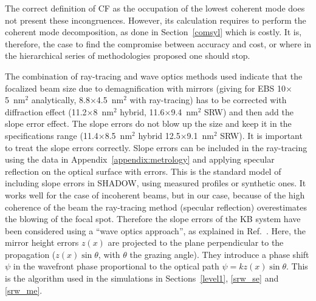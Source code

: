 \documentclass{iucr}              %
\newcommand{\inred}[1]{{\color{black}#1}}
\begin{document}
The correct definition of CF as the occupation of the lowest coherent mode does not present these incongruences. However, its calculation requires to perform the coherent mode decomposition, as done in Section~\ref{comsyl} which is costly. It is, therefore, the case to find the compromise between accuracy and cost, or where in the hierarchical series of methodologies proposed one should stop. 

The combination of ray-tracing and wave optics methods used indicate that the focalized beam size due to  demagnification with mirrors (giving for EBS 10$\times$5~nm$^2$ analytically, 8.8$\times$4.5~nm$^2$ with ray-tracing) has to be corrected with diffraction effect (11.2$\times$8~nm$^2$ hybrid, 11.6$\times$9.4~nm$^2$ SRW) and then add the slope error effect. The slope errors do not blow up the size and \inred{keep} it in the specifications range (11.4$\times$8.5~nm$^2$ hybrid 12.5$\times$9.1~nm$^2$ SRW). It is important to treat the slope errors correctly. Slope errors can be included in the ray-tracing using the data in Appendix~\ref{appendix:metrology} and applying specular reflection on the optical surface with errors. This is the standard model of including slope errors in SHADOW, using measured profiles or synthetic ones. It works well for the case of incoherent beams, but in our case, because of the high coherence of the beam the ray-tracing method (specular reflection) overestimates the blowing of the focal spot. Therefore the slope errors of the KB system have been considered using a ``wave optics approach'', as explained in Ref.~\cite{hybrid}. Here, the mirror height errors $z(x)$ are projected to the plane perpendicular to the propagation ($z(x) \sin \theta$, with $\theta$ the grazing angle). They introduce a phase shift $\psi$ in the wavefront phase proportional to the optical path $\psi = k z(x) \sin \theta $. This is the algorithm used in the simulations in Sections~\ref{level1}, \ref{srw_se} and \ref{srw_me}.   
 
\end{document}
